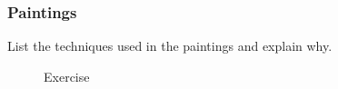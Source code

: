 \documentclass{beamer}
\begin{document}
\begin{frame}
\frametitle{Paintings}
List the techniques used in the paintings and explain why.
\begin{figure}[!htbp] 
\centering 
{}
\caption{Exercise} 
\end{figure}
\end{frame}
\end{document}
